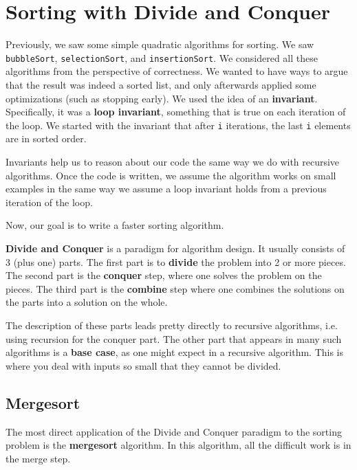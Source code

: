 \chapter{Sorting with Divide and Conquer}


Previously, we saw some simple quadratic algorithms for sorting.
We saw \texttt{bubbleSort}, \texttt{selectionSort}, and \texttt{insertionSort}.
We considered all these algorithms from the perspective of correctness.
We wanted to have ways to argue that the result was indeed a sorted list, and only afterwards applied some optimizations (such as stopping early).
We used the idea of an \textbf{invariant}.
Specifically, it was a \textbf{loop invariant}, something that is true on each iteration of the loop.
We started with the invariant that after \texttt{i} iterations, the last \texttt{i} elements are in sorted order.


Invariants help us to reason about our code the same way we do with recursive algorithms.
Once the code is written, we assume the algorithm works on small examples in the same way we assume a loop invariant holds from a previous iteration of the loop.


Now, our goal is to write a faster sorting algorithm.


\textbf{Divide and Conquer} is a paradigm for algorithm design.
It usually consists of 3 (plus one) parts.
The first part is to \textbf{divide} the problem into 2 or more pieces.
The second part is the \textbf{conquer} step, where one solves the problem on the pieces.
The third part is the \textbf{combine} step where one combines the solutions on the parts into a solution on the whole.


The description of these parts leads pretty directly to recursive algorithms, i.e. using recursion for the conquer part.
The other part that appears in many such algorithms is a \textbf{base case}, as one might expect in a recursive algorithm.
This is where you deal with inputs so small that they cannot be divided.

\section{Mergesort}


The most direct application of the Divide and Conquer paradigm to the sorting problem is the \textbf{mergesort} algorithm.
In this algorithm, all the difficult work is in the merge step.

